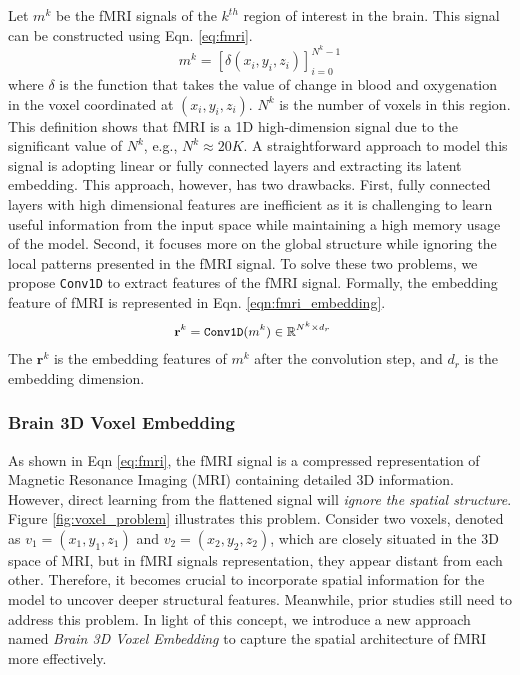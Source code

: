 Let $m^k$ be the fMRI signals of the $k^{th}$ region of interest in the brain. This signal can be constructed using Eqn. \eqref{eq:fmri}.
\begin{equation}
    \label{eq:fmri}
    m^k = \left[\delta(x_i, y_i, z_i)\right]_{i=0}^{N^k - 1}
\end{equation}
where $\delta$ is the function that takes the value of change in blood and oxygenation in the voxel coordinated at $(x_i, y_i, z_i)$. $N^k$ is the number of voxels in this region. This definition shows that fMRI is a 1D high-dimension signal due to the significant value of $N^k$, e.g., $N^k \approx 20K$.
A straightforward approach to model this signal is adopting linear or fully connected layers \cite{scotti2023reconstructing} and extracting its latent embedding. This approach, however, has two drawbacks. First, fully connected layers with high dimensional features are inefficient as it is challenging to learn useful information from the input space while maintaining a high memory usage of the model. Second, it focuses more on the global structure while ignoring the local patterns presented in the fMRI signal. To solve these two problems, we propose \texttt{Conv1D} to extract features of the fMRI signal. Formally, the embedding feature of fMRI is represented in Eqn. \eqref{eqn:fmri_embedding}.
\begin{equation} \label{eqn:fmri_embedding}
\small
\begin{split}
    \mathbf{r}^k & = \texttt{Conv1D}(m^k) \in \mathbb{R} ^ {N^k \times d_r}
\end{split}
\end{equation}
The $\mathbf{r}^k$ is the embedding features of $m^k$ after the convolution step, and $d_r$ is the embedding dimension.

\subsubsection{Brain 3D Voxel Embedding}

\label{sec:voxel_embeding}

As shown in Eqn \eqref{eq:fmri}, the fMRI signal is a compressed representation of Magnetic Resonance Imaging (MRI) containing detailed 3D information.
However, direct learning from the flattened signal will \textit{ignore the spatial structure}. Figure \ref{fig:voxel_problem} illustrates this problem. 
Consider two voxels, denoted as $v_1 = (x_1, y_1, z_1)$ and $v_2 = (x_2, y_2, z_2)$, which are closely situated in the 3D space of MRI, but in fMRI signals representation, they appear distant from each other. Therefore, it becomes crucial to incorporate spatial information for the model to uncover deeper structural features.
Meanwhile, prior studies \cite{scotti2023reconstructing, takagi2023high, chen2023seeing} still need to address this problem. In light of this concept, we introduce a new approach named \textit{Brain 3D Voxel Embedding} to capture the spatial architecture of fMRI more effectively.

